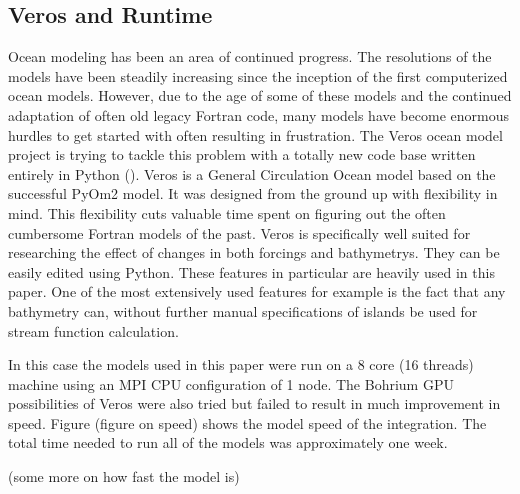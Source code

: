 \subsection{Veros and Runtime}
Ocean modeling has been an area of continued progress. The resolutions of the models have been steadily increasing since the inception of the first computerized ocean models. However, due to the age of some of these models and the continued adaptation of often old legacy Fortran code, many models have become enormous hurdles to get started with often resulting in frustration. The Veros ocean model project is trying to tackle this problem with a totally new code base written entirely in Python (\cite{Hafner2018Aug}). 
Veros is a General Circulation Ocean model based on the successful PyOm2 model. It was designed from the ground up with flexibility in mind. This flexibility cuts valuable time spent on figuring out the often cumbersome Fortran models of the past. Veros is specifically well suited for researching the effect of changes in both forcings and bathymetrys. They can be easily edited using Python. These features in particular are heavily used in this paper. One of the most extensively used features for example is the fact that any bathymetry can, without further manual specifications of islands be used for stream function calculation.

In this case the models used in this paper were run on a 8 core (16 threads) machine using an MPI CPU configuration of 1 node. The Bohrium GPU possibilities of Veros were also tried but failed to result in much improvement in speed. Figure (figure on speed) shows the model speed of the integration. The total time needed to run all of the models was approximately one week.

(some more on how fast the model is)